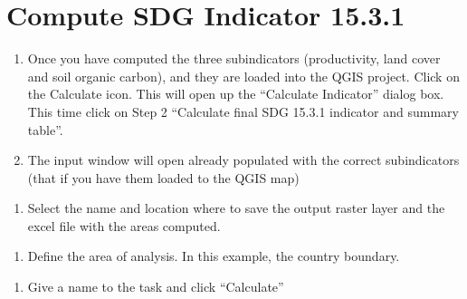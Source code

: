 \documentclass[letterpaper,10pt,english]{sphinxmanual}
\begin{document}


\section{Compute SDG Indicator 15.3.1}
\label{\detokenize{Qgis_Plugin/Calculate_sdg15:compute-sdg-indicator-15-3-1}}\begin{enumerate}
%
\item {} 
\sphinxAtStartPar
Once you have computed the three sub\sphinxhyphen{}indicators (productivity, land cover
and soil organic carbon), and they are loaded into the QGIS project. Click
on the Calculate icon. This will open up the “Calculate
Indicator” dialog box. This time click on Step 2 “Calculate final SDG 15.3.1
indicator and summary table”.

\item {} 
\sphinxAtStartPar
The input window will open already populated with the correct sub\sphinxhyphen{}indicators
(that if you have them loaded to the QGIS map)

\end{enumerate}

\begin{enumerate}
%
\setcounter{enumi}{2}
\item {} 
\sphinxAtStartPar
Select the name and location where to save the output raster layer and the
excel file with the areas computed.

\end{enumerate}

\begin{enumerate}
%
\setcounter{enumi}{3}
\item {} 
\sphinxAtStartPar
Define the area of analysis. In this example, the country boundary.

\end{enumerate}

\begin{enumerate}
%
\setcounter{enumi}{4}
\item {} 
\sphinxAtStartPar
Give a name to the task and click “Calculate”

\end{enumerate}
\end{document}
